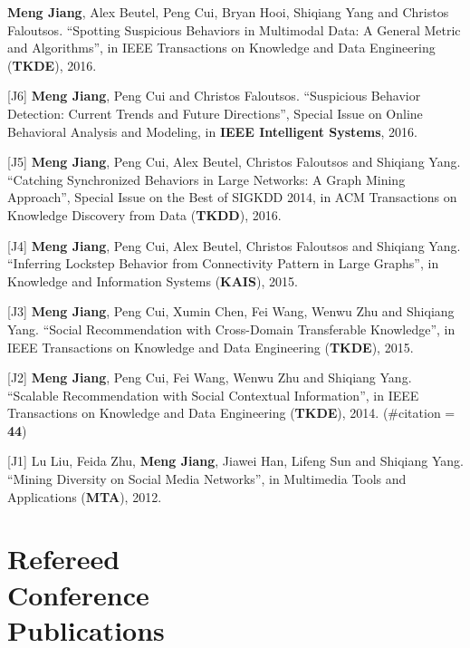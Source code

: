 \documentclass[margin, 10pt]{res}
\begin{document}
\begin{resume}
[J7] \textbf{Meng Jiang}, Alex Beutel, Peng Cui, Bryan Hooi, Shiqiang Yang and Christos Faloutsos. ``Spotting Suspicious Behaviors in Multimodal Data: A General Metric and Algorithms'', in IEEE Transactions on Knowledge and Data Engineering (\textbf{TKDE}), 2016. %

[J6] \textbf{Meng Jiang}, Peng Cui and Christos Faloutsos. ``Suspicious Behavior Detection: Current Trends and Future Directions'', Special Issue on Online Behavioral Analysis and Modeling, in \textbf{IEEE Intelligent Systems}, 2016. %

[J5] \textbf{Meng Jiang}, Peng Cui, Alex Beutel, Christos Faloutsos and Shiqiang Yang. ``Catching Synchronized Behaviors in Large Networks: A Graph Mining Approach'', Special Issue on the Best of SIGKDD 2014, in ACM Transactions on Knowledge Discovery from Data (\textbf{TKDD}), 2016. %

[J4] \textbf{Meng Jiang}, Peng Cui, Alex Beutel, Christos Faloutsos and Shiqiang Yang. ``Inferring Lockstep Behavior from Connectivity Pattern in Large Graphs'', in Knowledge and Information Systems (\textbf{KAIS}), 2015. %

[J3] \textbf{Meng Jiang}, Peng Cui, Xumin Chen, Fei Wang, Wenwu Zhu and Shiqiang Yang. ``Social Recommendation with Cross-Domain Transferable Knowledge'', in IEEE Transactions on Knowledge and Data Engineering (\textbf{TKDE}), 2015. %

[J2] \textbf{Meng Jiang}, Peng Cui, Fei Wang, Wenwu Zhu and Shiqiang Yang. ``Scalable Recommendation with Social Contextual Information'', in IEEE Transactions on Knowledge and Data Engineering (\textbf{TKDE}), 2014. (\#citation = \textbf{44}) %

[J1] Lu Liu, Feida Zhu, \textbf{Meng Jiang}, Jiawei Han, Lifeng Sun and Shiqiang Yang. ``Mining Diversity on Social Media Networks'', in Multimedia Tools and Applications (\textbf{MTA}), 2012. %


\section{Refereed \\ Conference \\ Publications}


\end{resume}
\end{document}
